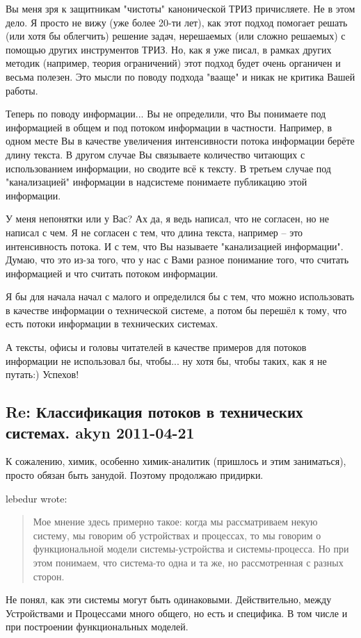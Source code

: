 \documentclass[a4paper,11pt]{article}
\begin{document}
Вы меня зря к защитникам "чистоты" канонической ТРИЗ причисляете. Не в этом
дело.  Я просто не вижу (уже более 20-ти лет), как этот подход помогает решать
(или хотя бы облегчить) решение задач, нерешаемых (или сложно решаемых) с
помощью других инструментов ТРИЗ.  Но, как я уже писал, в рамках других
методик (например, теория ограничений) этот подход будет очень органичен и
весьма полезен.  Это мысли по поводу подхода "вааще" и никак не критика Вашей
работы.

Теперь по поводу информации...  Вы не определили, что Вы понимаете под
информацией в общем и под потоком информации в частности.  Например, в одном
месте Вы в качестве увеличения интенсивности потока информации берёте длину
текста.  В другом случае Вы связываете количество читающих с использованием
информации, но сводите всё к тексту.  В третьем случае под "канализацией"
информации в надсистеме понимаете публикацию этой информации.

У меня непонятки или у Вас? Ах да, я ведь написал, что не согласен, но не
написал с чем.  Я не согласен с тем, что длина текста, например -- это
интенсивность потока.  И с тем, что Вы называете "канализацией информации".
Думаю, что это из-за того, что у нас с Вами разное понимание того, что считать
информацией и что считать потоком информации.

Я бы для начала начал с малого и определился бы с тем, что можно использовать
в качестве информации о технической системе, а потом бы перешёл к тому, что
есть потоки информации в технических системах.

А тексты, офисы и головы читателей в качестве примеров для потоков информации
не использовал бы, чтобы... ну хотя бы, чтобы таких, как я не путать:)
Успехов!

\subsection*{Re: Классификация потоков в технических системах. akyn
  2011-04-21}

К сожалению, химик, особенно химик-аналитик (пришлось и этим заниматься),
просто обязан быть занудой. Поэтому продолжаю придирки.

lebedur wrote:
\begin{quote}
  Мое мнение здесь примерно такое: когда мы рассматриваем некую систему, мы
  говорим об устройствах и процессах, то мы говорим о функциональной модели
  системы-устройства и системы-процесса. Но при этом понимаем, что система-то
  одна и та же, но рассмотренная с разных сторон.
\end{quote}
Не понял, как эти системы могут быть одинаковыми. Действительно, между
Устройствами и Процессами много общего, но есть и специфика. В том числе и при
построении функциональных моделей.
\end{document}
